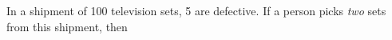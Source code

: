 
%
%
%
%
% 
% 

\question \begin{fullwidth} In a shipment of 100 television sets, 5 are defective. If a person picks 
\textit{two} sets from this shipment, then \end{fullwidth}


\ifprintanswers
\fi 

